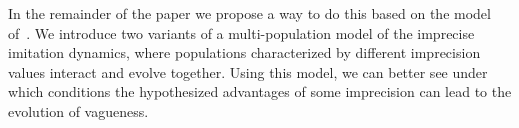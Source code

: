 \documentclass[a4paper]{article}
\begin{document}
%
In the remainder of the paper we propose a way to do this based on the model of~\textcite{franke_vagueness_2017}.
We introduce two variants of a multi-population model of the imprecise imitation dynamics, where populations characterized by different imprecision values interact and evolve together.
Using this model, we can better see under which conditions the hypothesized advantages of some imprecision can lead to the evolution of vagueness.

\end{document}

